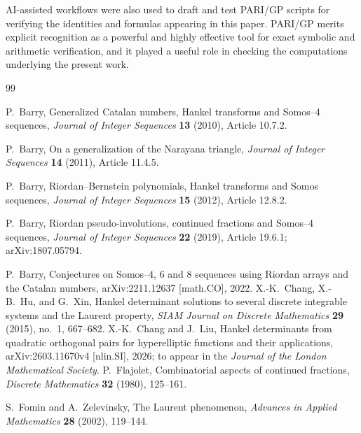 \documentclass[11pt]{article}
\theoremstyle{remark}
\begin{document}
AI-assisted workflows were also used to draft and test PARI/GP scripts for
verifying the identities and formulas appearing in this paper.  PARI/GP
merits explicit recognition as a powerful and highly effective tool for exact
symbolic and arithmetic verification, and it played a useful role in checking
the computations underlying the present work.

\begin{thebibliography}{99}

P.~Barry,
\newblock Generalized Catalan numbers, Hankel transforms and Somos--4 sequences,
\newblock \emph{Journal of Integer Sequences} \textbf{13} (2010), Article 10.7.2.

P.~Barry,
\newblock On a generalization of the Narayana triangle,
\newblock \emph{Journal of Integer Sequences} \textbf{14} (2011), Article 11.4.5.

P.~Barry,
\newblock Riordan--Bernstein polynomials, Hankel transforms and Somos sequences,
\newblock \emph{Journal of Integer Sequences} \textbf{15} (2012), Article 12.8.2.

P.~Barry,
\newblock Riordan pseudo-involutions, continued fractions and Somos--4 sequences,
\newblock \emph{Journal of Integer Sequences} \textbf{22} (2019), Article 19.6.1;
\newblock arXiv:1807.05794.

P.~Barry,
\newblock Conjectures on Somos--$4$, $6$ and $8$ sequences using Riordan arrays and the Catalan numbers,
\newblock arXiv:2211.12637 [math.CO], 2022.
X.-K.~Chang, X.-B.~Hu, and G.~Xin,
\newblock Hankel determinant solutions to several discrete integrable systems and the Laurent property,
\newblock \emph{SIAM Journal on Discrete Mathematics} \textbf{29} (2015), no.~1, 667--682.
X.-K.~Chang and J.~Liu,
\newblock Hankel determinants from quadratic orthogonal pairs for hyperelliptic functions and their applications,
\newblock arXiv:2603.11670v4 [nlin.SI], 2026; to appear in the \emph{Journal of the London Mathematical Society}.
P.~Flajolet,
\newblock Combinatorial aspects of continued fractions,
\newblock \emph{Discrete Mathematics} \textbf{32} (1980), 125--161.

S.~Fomin and A.~Zelevinsky,
\newblock The Laurent phenomenon,
\newblock \emph{Advances in Applied Mathematics} \textbf{28} (2002), 119--144.


\end{thebibliography}
\end{document}
